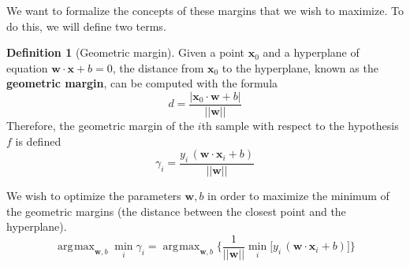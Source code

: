 \documentclass{article}
\DeclareMathOperator*{\argmax}{\arg\!\max}
\theoremstyle{definition}
\newtheorem{definition}{Definition}[section]
\begin{document}
  We want to formalize the concepts of these margins that we wish to maximize. To do this, we will define two terms. 

  \begin{definition}[Geometric margin]
      Given a point $\mathbf{x}_0$ and a hyperplane of equation $\mathbf{w} \cdot \mathbf{x} + b = 0$, the distance from $\mathbf{x}_0$ to the hyperplane, known as the \textbf{geometric margin}, can be computed with the formula 
      \begin{equation*}
          d = \frac{|\mathbf{x}_0 \cdot \mathbf{w} + b|}{||\mathbf{w}||}  
      \end{equation*} 
      Therefore, the geometric margin of the $i$th sample with respect to the hypothesis $f$ is defined 
      \begin{equation*}
          \gamma_i = \frac{y_i \, (\mathbf{w} \cdot \mathbf{x}_i + b)}{||\mathbf{w}||} 
      \end{equation*} 
  \end{definition}

  We wish to optimize the parameters $\mathbf{w}, b$ in order to maximize the minimum of the geometric margins (the distance between the closest point and the hyperplane). 
  \begin{equation*}
    \argmax_{\mathbf{w}, b} \min_i \gamma_i = \argmax_{\mathbf{w}, b} \bigg\{ \frac{1}{||\mathbf{w}||} \min_i \big[y_i \, (\mathbf{w} \cdot \mathbf{x}_i + b) \big] \bigg\}
  \end{equation*}
\end{document}
